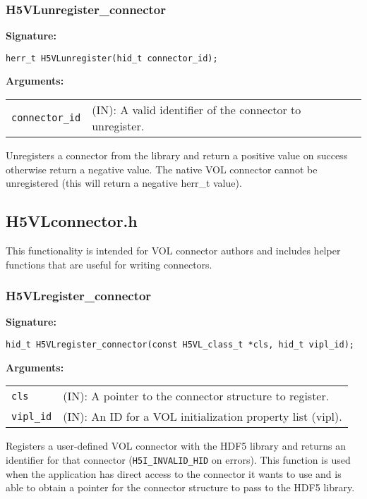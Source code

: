 \subsubsection{H5VLunregister\_connector}
\begin{mdframed}[style=bgbox]
\textbf{Signature:}
\begin{lstlisting}
herr_t H5VLunregister(hid_t connector_id);
\end{lstlisting}
\textbf{Arguments:}\\
\begin{tabular}{l p{13.5cm}}
  {\tt connector\_id} & (IN): A valid identifier of the connector to unregister.\\
\end{tabular}
\end{mdframed}
Unregisters a connector from the library and return a positive value on success otherwise return a negative value. The native VOL connector cannot be unregistered (this will return a negative herr\_t value).
\bigskip


\subsection{H5VLconnector.h}

This functionality is intended for VOL connector authors and includes helper
functions that are useful for writing connectors.

\subsubsection{H5VLregister\_connector}
\begin{mdframed}[style=bgbox]
\textbf{Signature:}
\begin{lstlisting}
hid_t H5VLregister_connector(const H5VL_class_t *cls, hid_t vipl_id);
\end{lstlisting}
\textbf{Arguments:}\\
\begin{tabular}{l p{13.5cm}}
  {\tt cls} & (IN): A pointer to the connector structure to register.\\
  {\tt vipl\_id} & (IN): An ID for a VOL initialization property list (vipl).\\
\end{tabular}
\end{mdframed}
Registers a user-defined VOL connector with the HDF5 library and returns an identifier for that connector (\texttt{H5I\_INVALID\_HID} on errors). This function is used when the application has direct access to the connector it wants to use and is able to obtain a pointer for the connector structure to pass to the HDF5 library.
\bigskip


